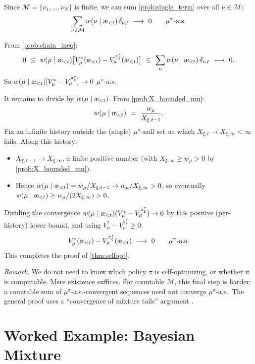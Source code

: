 \documentclass[fontsize=11pt, parskip=half]{scrartcl}
\theoremstyle{definition}
\newenvironment{solution}{%
    \begin{tcolorbox}[colback=black!5!white, colframe=black!50!white,
      title={\textbf{Solution}}, fonttitle=\normalfont, breakable]
  }{\end{tcolorbox}}
\newenvironment{solution}{\expandafter\comment}{\expandafter\endcomment}
\renewcommand{\thesection}{\arabic{section}}
\newcommand{\cM}{\mathcal{M}}
\newcommand{\aes}{\textnormal{\ae}}
\begin{document}
\begin{solution}
Since $\cM = \{\nu_1, \ldots, \nu_N\}$ is finite, we can sum \cref{prob:single_term} over all $\nu \in \cM$:
\[
    \sum_{\nu \in \cM} w(\nu \mid \aes_{<t})\, \delta_{\nu,t} ~\longrightarrow~ 0 \qquad \mu^\pi\text{-a.s.}
\]

From \cref{prob:chain_ineq}:
\[
    0 ~\leq~ w(\mu \mid \aes_{<t})\big[V_\mu^*(\aes_{<t}) - V_\mu^{\pi_\xi^*}(\aes_{<t})\big]
    ~\leq~ \sum_\nu w(\nu \mid \aes_{<t})\, \delta_{\nu,t}
    ~\longrightarrow~ 0.
\]
So $w(\mu \mid \aes_{<t})[V_\mu^* - V_\mu^{\pi_\xi^*}] \to 0$ $\mu^\pi$-a.s.

It remains to divide by $w(\mu \mid \aes_{<t})$. From \cref{prob:X_bounded_mu}:
\[
    w(\mu \mid \aes_{<t}) ~=~ \frac{w_\mu}{X_{\xi,t-1}}.
\]
Fix an infinite history outside the (single) $\mu^\pi$-null set on which $X_{\xi,t} \to X_{\xi,\infty} < \infty$ fails. Along this history:
\begin{itemize}\itemsep=2pt
    \item $X_{\xi,t-1} \to X_{\xi,\infty}$, a finite positive number (with $X_{\xi,\infty} \geq w_\mu > 0$ by \cref{prob:X_bounded_mu}).
    \item Hence $w(\mu \mid \aes_{<t}) = w_\mu / X_{\xi,t-1} \to w_\mu / X_{\xi,\infty} > 0$, so eventually $w(\mu \mid \aes_{<t}) \geq w_\mu / (2 X_{\xi,\infty}) > 0$.
\end{itemize}
Dividing the convergence $w(\mu \mid \aes_{<t}) (V_\mu^* - V_\mu^{\pi_\xi^*}) \to 0$ by this positive (per-history) lower bound, and using $V_\mu^* - V_\mu^{\pi_\xi^*} \geq 0$:
\[
    V_\mu^*(\aes_{<t}) - V_\mu^{\pi_\xi^*}(\aes_{<t}) ~\longrightarrow~ 0 \qquad \mu^\pi\text{-a.s.}
\]
This completes the proof of \cref{thm:selfopt}. \qedhere

\medskip
\end{solution}

\textit{Remark.} We do not need to know which policy $\tilde\pi$ is self-optimizing, or whether it is computable. Mere existence suffices.
For countable $\cM$, this final step is harder: a countable sum of $\mu^\pi$-a.s.-convergent sequences need not converge $\mu^\pi$-a.s.\ The general proof uses a ``convergence of mixture tails'' argument \cite[Lem.~5.28]{Hutter:04uaibook}.

\clearpage
\appendix
\renewcommand{\thesection}{\Alph{section}}

\section{Worked Example: Bayesian Mixture}\label{sec:appendix_mixture}
\end{document}
